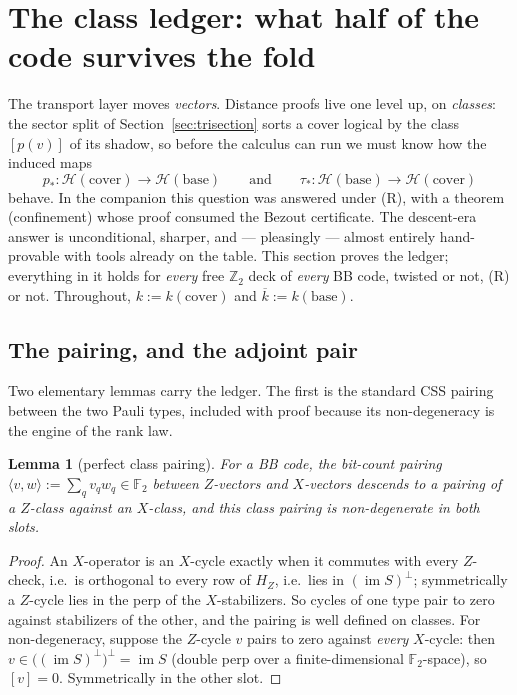 \documentclass[11pt]{article}
\theoremstyle{plain}
\newtheorem{lemma}[theorem]{Lemma}
\theoremstyle{definition}
\theoremstyle{remark}
\newcommand{\F}{\mathbb{F}}
\newcommand{\Z}{\mathbb{Z}}
\newcommand{\clH}{\mathcal{H}}
\newcommand{\base}{\mathrm{base}}
\newcommand{\cov}{\mathrm{cover}}
\newcommand{\ov}[1]{\overline{#1}}
\begin{document}
\section{The class ledger: what half of the code survives the fold}
\label{sec:ledger}

The transport layer moves \emph{vectors}. Distance proofs live one level
up, on \emph{classes}: the sector split of Section~\ref{sec:trisection}
sorts a cover logical by the class $[p(v)]$ of its shadow, so before the
calculus can run we must know how the induced maps
\[
p_* : \clH(\cov) \to \clH(\base)
\qquad\text{and}\qquad
\tau_* : \clH(\base) \to \clH(\cov)
\]
behave. In the companion this question was answered under (R), with a
theorem (confinement) whose proof consumed the Bezout certificate. The
descent-era answer is unconditional, sharper, and --- pleasingly ---
almost entirely hand-provable with tools already on the table. This
section proves the ledger; everything in it holds for \emph{every} free
$\Z_2$ deck of \emph{every} BB code, twisted or not, (R) or not.
Throughout, $k := k(\cov)$ and $\ov k := k(\base)$.

\subsection{The pairing, and the adjoint pair}

Two elementary lemmas carry the ledger. The first is the standard CSS
pairing between the two Pauli types, included with proof because its
non-degeneracy is the engine of the rank law.

\begin{lemma}[perfect class pairing]\label{lem:pairing}
For a BB code, the bit-count pairing $\langle v, w\rangle := \sum_q v_q
w_q \in \F_2$ between $Z$-vectors and $X$-vectors descends to a pairing
of a $Z$-class against an $X$-class, and this class pairing is
non-degenerate in both slots.
\end{lemma}

\begin{proof}
An $X$-operator is an $X$-cycle exactly when it commutes with every
$Z$-check, i.e.\ is orthogonal to every row of $H_Z$, i.e.\ lies in
$(\operatorname{im} S)^{\perp}$; symmetrically a $Z$-cycle lies in the
perp of the $X$-stabilizers. So cycles of one type pair to zero against
stabilizers of the other, and the pairing is well defined on classes. For
non-degeneracy, suppose the $Z$-cycle $v$ pairs to zero against
\emph{every} $X$-cycle: then $v \in \bigl((\operatorname{im}
S)^{\perp}\bigr)^{\perp} = \operatorname{im} S$ (double perp over a
finite-dimensional $\F_2$-space), so $[v] = 0$. Symmetrically in the
other slot.
\end{proof}
\end{document}
